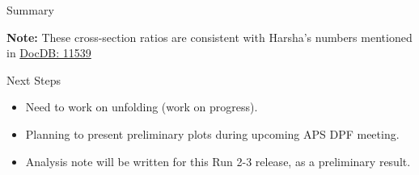 \documentclass[aspectratio=169]{beamer}
\begin{document}
\begin{frame}{Summary}
\begin{table}[H]
    \centering
    \renewcommand{\arraystretch}{1.5}
\end{table}
\vspace{0.2cm}
\footnotesize
\textbf{Note:} These cross-section ratios are consistent with Harsha's numbers mentioned in \href{https://seaquest-docdb.fnal.gov/cgi-bin/sso/RetrieveFile?docid=11539&filename=dy_csr_runs_2_3.pdf&version=2}{DocDB: 11539}
\normalsize
\end{frame}\begin{frame}{Next Steps}
\begin{itemize}
    \setlength{\itemsep}{1em}
    \item Need to work on unfolding (work on progress).
    \item Planning to present preliminary plots during upcoming APS DPF meeting.
    \item Analysis note will be written for this Run 2-3 release, as a preliminary result.
\end{itemize}

\end{frame}
\end{document}
